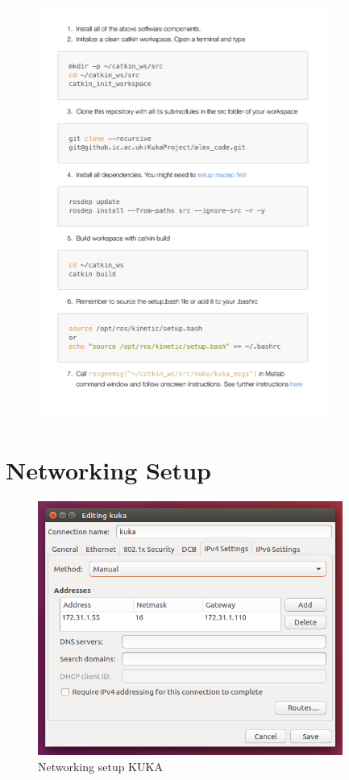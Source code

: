 \documentclass[headsepline,footinclude=false,fontsize=11pt,paper=a4,listof=totoc,bibliography=totoc,BCOR=12mm,DIV=14]{scrbook}
\begin{document}
\begin{figure}[h!]
    \centering
    \includegraphics[width=0.85\textwidth]{figures/readme}
\end{figure}

\newpage


\section{Networking Setup}\label{networking}

\begin{figure}[h!]
    \centering
    \includegraphics[width=10cm]{figures/network_kuka}
    \caption{Networking setup KUKA}
    \label{fig:net_kuka}
\end{figure}
\end{document}
